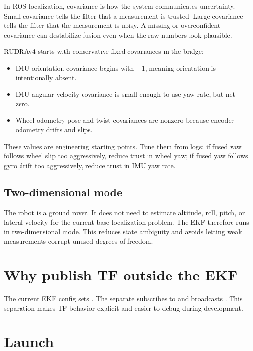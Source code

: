 In ROS localization, covariance is how the system communicates uncertainty. Small covariance tells the filter that a measurement is trusted. Large covariance tells the filter that the measurement is noisy. A missing or overconfident covariance can destabilize fusion even when the raw numbers look plausible.

RUDRAv4 starts with conservative fixed covariances in the bridge:

\begin{itemize}
  \item IMU orientation covariance begins with \(-1\), meaning orientation is intentionally absent.
  \item IMU angular velocity covariance is small enough to use yaw rate, but not zero.
  \item Wheel odometry pose and twist covariances are nonzero because encoder odometry drifts and slips.
\end{itemize}

These values are engineering starting points. Tune them from logs: if fused yaw follows wheel slip too aggressively, reduce trust in wheel yaw; if fused yaw follows gyro drift too aggressively, reduce trust in IMU yaw rate.

\subsection{Two-dimensional mode}

The robot is a ground rover. It does not need to estimate altitude, roll, pitch, or lateral velocity for the current base-localization problem. The EKF therefore runs in two-dimensional mode. This reduces state ambiguity and avoids letting weak measurements corrupt unused degrees of freedom.

\section{Why publish TF outside the EKF}

The current EKF config sets . The separate  subscribes to  and broadcasts . This separation makes TF behavior explicit and easier to debug during development.

\section{Launch}

